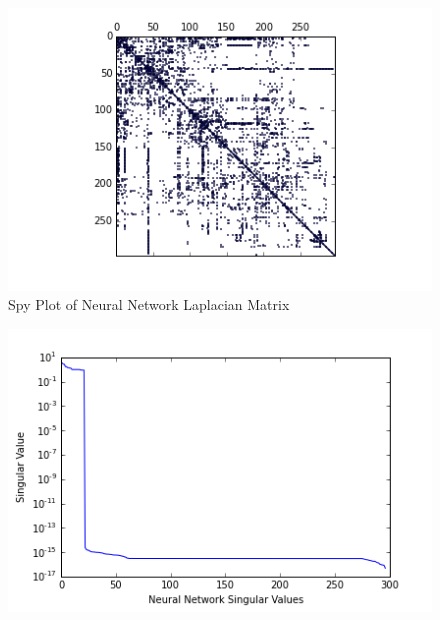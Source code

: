 \documentclass{article}
\begin{document}
\begin{figure}[H]
\centering
\includegraphics[width = \linewidth]{neuralspy.png}
\caption{Spy Plot of Neural Network Laplacian Matrix}
\end{figure}
\begin{figure}[H]
\centering
\includegraphics[width = .9\linewidth]{neuralsing.png}
\end{figure}
\end{document}
